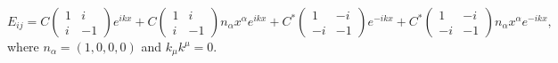 \documentclass[10pt,letterpaper]{article}
\numberwithin{equation}{subsection}
\begin{document}
\begin{equation}
\boxed{
E_{ij} = C\begin{pmatrix} 1&i\\i&-1\end{pmatrix} e^{ikx} + C\begin{pmatrix} 1&i\\i&-1\end{pmatrix}  n_\alpha x^\alpha e^{ikx}
+C^*\begin{pmatrix} 1&-i\\-i&-1\end{pmatrix} e^{-ikx} + C^*\begin{pmatrix} 1&-i\\-i&-1\end{pmatrix}  n_\alpha x^\alpha e^{-ikx}},
\end{equation}
where $n_{\alpha} = (1,0,0,0)$ and $k_\mu k^\mu  =0$.
\end{document}

